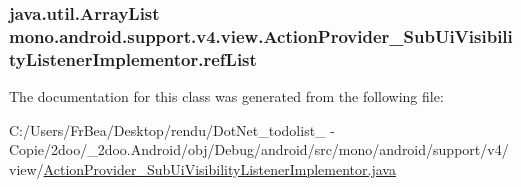 \hypertarget{classmono_1_1android_1_1support_1_1v4_1_1view_1_1_action_provider___sub_ui_visibility_listener_implementor_da163f3c59554b7a5024a7bb1020e70c}{
\subsubsection[{refList}]{\setlength{\rightskip}{0pt plus 5cm}java.util.ArrayList {\bf mono.android.support.v4.view.ActionProvider\_\-SubUiVisibilityListenerImplementor.refList}}}
\label{classmono_1_1android_1_1support_1_1v4_1_1view_1_1_action_provider___sub_ui_visibility_listener_implementor_da163f3c59554b7a5024a7bb1020e70c}




The documentation for this class was generated from the following file:\begin{CompactItemize}
\item 
C:/Users/FrBea/Desktop/rendu/DotNet\_\-todolist\_ - Copie/2doo/\_\-2doo.Android/obj/Debug/android/src/mono/android/support/v4/view/\hyperlink{_action_provider___sub_ui_visibility_listener_implementor_8java}{ActionProvider\_\-SubUiVisibilityListenerImplementor.java}\end{CompactItemize}
